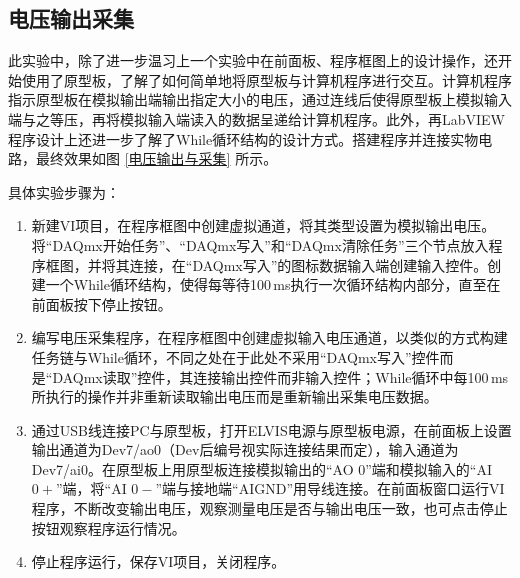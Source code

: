\documentclass[UTF8]{article}
\theoremstyle{MyLineTheoremStyle} %
\theoremstyle{MyBlockTheoremStyle} %
\theoremstyle{MySubsubsectionStyle} %
\begin{document}
\subsection{电压输出采集}
此实验中，除了进一步温习上一个实验中在前面板、程序框图上的设计操作，还开始使用了原型板，了解了如何简单地将原型板与计算机程序进行交互。计算机程序指示原型板在模拟输出端输出指定大小的电压，通过连线后使得原型板上模拟输入端与之等压，再将模拟输入端读入的数据呈递给计算机程序。此外，再LabVIEW程序设计上还进一步了解了While循环结构的设计方式。搭建程序并连接实物电路，最终效果如图 \ref{电压输出与采集} 所示。

\noindent 具体实验步骤为：
\begin{enumerate}
\item 新建VI项目，在程序框图中创建虚拟通道，将其类型设置为模拟输出电压。将“DAQmx开始任务”、“DAQmx写入”和“DAQmx清除任务”三个节点放入程序框图，并将其连接，在“DAQmx写入”的图标数据输入端创建输入控件。创建一个While循环结构，使得每等待100\,ms执行一次循环结构内部分，直至在前面板按下停止按钮。
\item 编写电压采集程序，在程序框图中创建虚拟输入电压通道，以类似的方式构建任务链与While循环，不同之处在于此处不采用“DAQmx写入”控件而是“DAQmx读取”控件，其连接输出控件而非输入控件；While循环中每100\,ms所执行的操作并非重新读取输出电压而是重新输出采集电压数据。
\item 通过USB线连接PC与原型板，打开ELVIS电源与原型板电源，在前面板上设置输出通道为Dev7/ao0（Dev后编号视实际连接结果而定），输入通道为Dev7/ai0。在原型板上用原型板连接模拟输出的“AO 0”端和模拟输入的“AI $ 0+ $”端，将“AI $ 0- $”端与接地端“AIGND”用导线连接。在前面板窗口运行VI程序，不断改变输出电压，观察测量电压是否与输出电压一致，也可点击停止按钮观察程序运行情况。
\item 停止程序运行，保存VI项目，关闭程序。
\end{enumerate}
\end{document}
